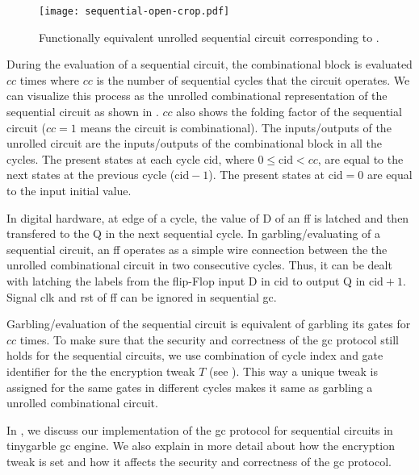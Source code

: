 \begin{figure}
  \centering
  \texttt{[image: sequential-open-crop.pdf]}
  \caption{Functionally equivalent unrolled sequential circuit corresponding to .}
  \label{fig:open-sequential}
\end{figure}

During the evaluation of a sequential circuit, the combinational block is evaluated $cc$ times where $cc$ is the number of sequential cycles that the circuit operates.
We can visualize this process as the unrolled combinational representation of the sequential circuit as shown in .
$cc$ also shows the folding factor of the sequential circuit ($cc=1$ means the circuit is combinational).
The inputs/outputs of the unrolled circuit are the inputs/outputs of the combinational block in all the cycles.
The present states at each cycle $\textrm{cid}$, where $0 \le \textrm{cid} < cc$, are equal to the next states at the previous cycle ($\textrm{cid}-1$).
The present states at $\textrm{cid}=0$ are equal to the input initial value.

In digital hardware, at edge of a cycle, the value of D of an \acrshort{ff} is latched and then transfered to the Q in the next sequential cycle.
In garbling/evaluating of a sequential circuit, an \acrshort{ff} operates as a simple wire connection between the the unrolled combinational circuit in two consecutive cycles.
Thus, it can be dealt with latching the labels from the flip-Flop input D in $\textrm{cid}$ to output Q in $\textrm{cid}+1$.
Signal clk and rst of \acrshort{ff} can be ignored in sequential \acrshort{gc}.

Garbling/evaluation of the sequential circuit is equivalent of garbling its gates for $cc$ times.
To make sure that the security and correctness of the \acrshort{gc} protocol still holds for the sequential circuits, we use combination of cycle index and gate identifier for the the encryption tweak $T$ (see ).
This way a unique tweak is assigned for the same gates in different cycles makes it same as garbling a unrolled combinational circuit.

In , we discuss our implementation of the \acrshort{gc} protocol for sequential circuits in \gls{tinygarble} \acrshort{gc} engine.
We also explain in more detail about how the encryption tweak is set and how it affects the security and correctness of the \acrshort{gc} protocol.


